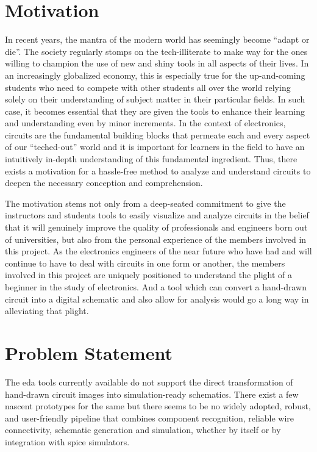 \section{Motivation}

In recent years, the mantra of the modern world has seemingly become ``adapt or die''. The society regularly stomps on the tech-illiterate to make way for the ones willing to champion the use of new and shiny tools in all aspects of their lives. In an increasingly globalized economy, this is especially true for the up-and-coming students who need to compete with other students all over the world relying solely on their understanding of subject matter in their particular fields. In such case, it becomes essential that they are given the tools to enhance their learning and understanding even by minor increments. In the context of electronics, circuits are the fundamental building blocks that permeate each and every aspect of our ``teched-out'' world and it is important for learners in the field to have an intuitively in-depth understanding of this fundamental ingredient. Thus, there exists a motivation for a hassle-free method to analyze and understand circuits to deepen the necessary conception and comprehension.

The motivation stems not only from a deep-seated commitment to give the instructors and students tools to easily visualize and analyze circuits in the belief that it will genuinely improve the quality of professionals and engineers born out of universities, but also from the personal experience of the members involved in this project. As the electronics engineers of the near future who have had and will continue to have to deal with circuits in one form or another, the members involved in this project are uniquely positioned to understand the plight of a beginner in the study of electronics. And a tool which can convert a hand-drawn circuit into a digital schematic and also allow for analysis would go a long way in alleviating that plight.

\section{Problem Statement}

The \gls{eda} tools currently available do not support the direct transformation of hand-drawn circuit images into simulation-ready schematics. There exist a few nascent prototypes for the same but there seems to be no widely adopted, robust, and user-friendly pipeline that combines component recognition, reliable wire connectivity, schematic generation and simulation, whether by itself or by integration with \gls{spice} simulators. 

